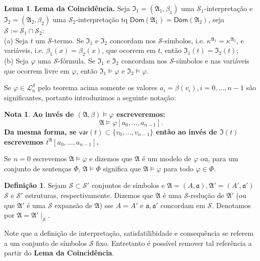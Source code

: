 \documentclass[11pt]{article}
\theoremstyle{definition}
\newtheorem{defn}{Definição}
\newtheorem{note}{Nota}
\newtheorem{lemma}{Lema}
\newcommand{\mc}[1]{\mathcal{#1}}
\newcommand{\mf}[1]{\mathfrak{#1}}
\newcommand{\msf}[1]{\mathsf{#1}}
\begin{document}
\begin{lemma}
\textbf{Lema da Coincidência.} Seja $\mf{I}_1=(\mf{A}_1,\beta_1)$ uma $\mc{S}_1$-interpretação e $\mf{I}_2=(\mf{A}_2,\beta_2)$ uma $\mc{S}_2$-interpretação tq $\msf{Dom}(\mf{A}_1)=\msf{Dom}(\mf{A}_2)$, seja $\mc{S}:=\mc{S}_1\cap\mc{S}_2$:\\
(a) Seja $t$ um $\mc{S}$-termo. Se $\mf{I}_1$ e $\mf{I}_2$ concordam nos $\mc{S}$-símbolos, i.e. $\kappa^\mf{A_1}=\kappa^\mf{A_2}$, e variáveis, i.e. $\beta_1(x)=\beta_2(x)$, que ocorrem em $t$, então $\mf{I}_1(t)=\mf{I}_2(t)$;\\
(b) Seja $\varphi$ uma $\mc{S}$-fórmula. Se $\mf{I}_1$ e $\mf{I}_2$ concordam nos $\mc{S}$-símbolos e nas variáveis que ocorrem livre em $\varphi$, então $\mf{I}_1\vDash\varphi$ e $\mf{I}_2\vDash\varphi$.
\end{lemma}

Se $\varphi\in\mc{L}^\mc{S}_n$ pelo teorema acima somente os valores $a_i=\beta(v_i),i=0,\dots,n-1$ são significantes, portanto introduzimos a seguinte notação:

\begin{note}
\textbf{Ao invés de $(\mf{A},\beta)\vDash\varphi$ escreveremos:
\[
\mf{A}\vDash\varphi[a_0,\dots,a_{n-1}].
\]
Da mesma forma, se $\msf{var}(t)\subset\{v_0,\dots,v_{n-1}\}$ então ao invés de $\mf{I}(t)$ escrevemos $t^\mf{A}[a_0,\dots,a_{n-1}]$.}
\end{note}

Se $n=0$ escrevemos $\mf{A}\vDash\varphi$ e dizemos que $\mf{A}$ é um modelo de $\varphi$ ou, para um conjunto de sentenças $\Phi$, $\mf{A}\vDash\Phi$ significa que $\mf{A}\vDash\varphi$ para todo $\varphi\in\Phi$.

\begin{shaded}
\begin{defn}
Sejam $\mc{S}\subset\mc{S}'$ conjuntos de símbolos e $\mf{A}=(A,\mf{a}),\mf{A}'=(A',\mf{a}')$ $\mc{S}$ e $\mc{S}'$ estruturas, respectivamente. Dizemos que $\mf{A}$ é uma $\mc{S}$-redução de $\mf{A}'$ (ou que $\mf{A}'$ é uma $\mc{S}$ expansão de $\mf{A}$) sse $A=A'$ e $\mf{a},\mf{a}'$ concordam em $\mc{S}$. Denotamos por $\mf{A}=\mf{A}'\mid_\mc{S}$.
\end{defn}
\end{shaded}

Note que a definição de interpretação, satisfatilibidade e consequência se referem a um conjunto de símbolos $\mc{S}$ fixo. Entretanto é possível remover tal referência a partir do \textbf{Lema da Coincidência}.
\end{document}
